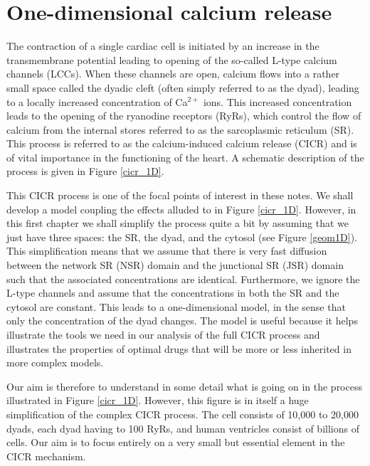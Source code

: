 
\chapter{One-dimensional calcium release\label{Ca_release_1D}}

The contraction of a single cardiac cell is initiated by an increase in the transmembrane potential leading to opening of the so-called L-type calcium channels (LCCs). When these channels are open, calcium flows into a rather small space called the dyadic cleft (often simply referred to as the dyad), leading to a locally increased concentration of Ca$^{2+}$ ions. This increased concentration leads to  the opening of the ryanodine receptors (RyRs), which control the flow of calcium from the internal stores referred to as the sarcoplasmic reticulum (SR). This process is referred to as the calcium-induced calcium release (CICR) and is of vital importance in the functioning of the heart. A schematic description of the process is given in Figure \ref{cicr_1D}. 


This CICR process is one of the focal points of interest in these notes. We shall develop a model coupling the effects alluded to in Figure \ref{cicr_1D}. However, in this first chapter we shall simplify the process quite a bit by assuming that we just have three spaces: the SR, the dyad, and the cytosol (see Figure \ref{geom1D}). This simplification means that we assume that there is very fast diffusion between the network SR (NSR) domain and the junctional SR (JSR) domain such that the associated concentrations are identical. 
Furthermore, we ignore the L-type channels and assume that the concentrations in both the SR and the cytosol are constant. This leads to a one-dimensional model, in the sense that only the concentration of the dyad changes. The model is useful because it helps illustrate the tools we need in our analysis of the full CICR process and illustrates the properties of optimal drugs that will be more or less inherited in more complex models.  

Our aim is therefore to understand in some detail what is going on in the process illustrated in  Figure \ref{cicr_1D}. However, this figure is in itself a huge simplification of the complex CICR process. The cell consists of 10,000 to 20,000 dyads, each dyad having  to 100 RyRs, and human ventricles consist of billions of cells. Our aim is to focus entirely on a very small but essential element in the CICR mechanism.

